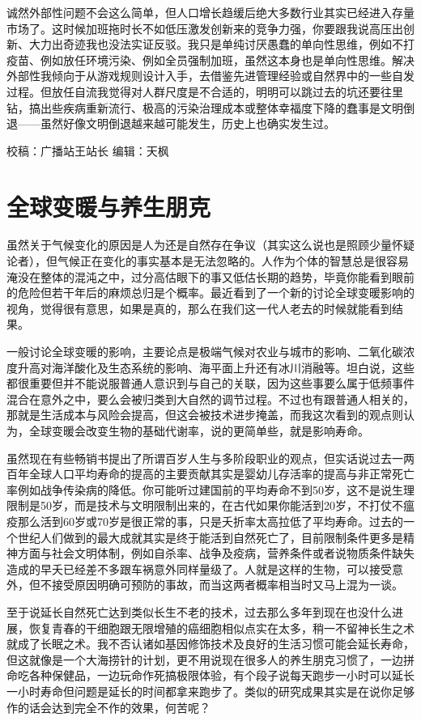 \documentclass[]{book}
\begin{document}
诚然外部性问题不会这么简单，但人口增长趋缓后绝大多数行业其实已经进入存量市场了。这时候加班拖时长不如低压激发创新来的竞争力强，你要跟我说高压出创新、大力出奇迹我也没法实证反驳。我只是单纯讨厌愚蠢的单向性思维，例如不打疫苗、例如放任环境污染、例如全员强制加班，虽然这本身也是单向性思维。解决外部性我倾向于从游戏规则设计入手，去借鉴先进管理经验或自然界中的一些自发过程。但放任自流我觉得对人群尺度是不合适的，明明可以跳过去的坑还要往里钻，搞出些疾病重新流行、极高的污染治理成本或整体幸福度下降的蠢事是文明倒退------虽然好像文明倒退越来越可能发生，历史上也确实发生过。

校稿：广播站王站长
编辑：天枫

\hypertarget{ux5168ux7403ux53d8ux6696ux4e0eux517bux751fux670bux514b}{%
\section{全球变暖与养生朋克}\label{ux5168ux7403ux53d8ux6696ux4e0eux517bux751fux670bux514b}}

虽然关于气候变化的原因是人为还是自然存在争议（其实这么说也是照顾少量怀疑论者），但气候正在变化的事实基本是无法忽略的。人作为个体的智慧总是很容易淹没在整体的混沌之中，过分高估眼下的事又低估长期的趋势，毕竟你能看到眼前的危险但若干年后的麻烦总归是个概率。最近看到了一个新的讨论全球变暖影响的视角，觉得很有意思，如果是真的，那么在我们这一代人老去的时候就能看到结果。

一般讨论全球变暖的影响，主要论点是极端气候对农业与城市的影响、二氧化碳浓度升高对海洋酸化及生态系统的影响、海平面上升还有冰川消融等。坦白说，这些都很重要但并不能说服普通人意识到与自己的关联，因为这些事要么属于低频事件混合在意外之中，要么会被归类到大自然的调节过程。不过也有跟普通人相关的，那就是生活成本与风险会提高，但这会被技术进步掩盖，而我这次看到的观点则认为，全球变暖会改变生物的基础代谢率，说的更简单些，就是影响寿命。

虽然现在有些畅销书提出了所谓百岁人生与多阶段职业的观点，但实话说过去一两百年全球人口平均寿命的提高的主要贡献其实是婴幼儿存活率的提高与非正常死亡率例如战争传染病的降低。你可能听过建国前的平均寿命不到50岁，这不是说生理限制是50岁，而是技术与文明限制出来的，在古代如果你能活到20岁，不打仗不瘟疫那么活到60岁或70岁是很正常的事，只是夭折率太高拉低了平均寿命。过去的一个世纪人们做到的最大成就其实是终于能活到自然死亡了，目前限制条件更多是精神方面与社会文明体制，例如自杀率、战争及疫病，营养条件或者说物质条件缺失造成的早夭已经差不多跟车祸意外同样量级了。人就是这样的生物，可以接受意外，但不接受原因明确可预防的事故，而当这两者概率相当时又马上混为一谈。

至于说延长自然死亡达到类似长生不老的技术，过去那么多年到现在也没什么进展，恢复青春的干细胞跟无限增殖的癌细胞相似点实在太多，稍一不留神长生之术就成了长眠之术。我不否认诸如基因修饰技术及良好的生活习惯可能会延长寿命，但这就像是一个大海捞针的计划，更不用说现在很多人的养生朋克习惯了，一边拼命吃各种保健品，一边玩命作死搞极限体验，有个段子说每天跑步一小时可以延长一小时寿命但问题是延长的时间都拿来跑步了。类似的研究成果其实是在说你足够作的话会达到完全不作的效果，何苦呢？
\end{document}
